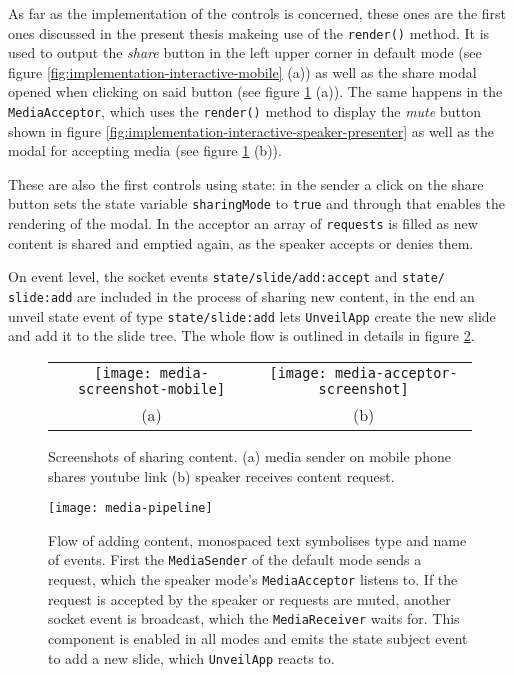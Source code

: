 As far as the implementation of the controls is concerned, these ones are the first ones discussed in the present thesis makeing use of the \texttt{render()} method. It is used to output the \emph{share} button in the left upper corner in default mode (see figure \ref{fig:implementation-interactive-mobile} (a)) as well as the share modal opened when clicking on said button (see figure \ref{fig:implementation-interactive-media} (a)). The same happens in the \texttt{MediaAcceptor}, which uses the \texttt{render()} method to display the \emph{mute} button shown in figure \ref{fig:implementation-interactive-speaker-presenter} as well as the modal for accepting media (see figure \ref{fig:implementation-interactive-media} (b)).

These are also the first controls using state: in the sender a click on the share button sets the state variable \texttt{sharingMode} to \texttt{true} and through that enables the rendering of the modal. In the acceptor an array of \texttt{requests} is filled as new content is shared and emptied again, as the speaker accepts or denies them.

On event level, the socket events \texttt{state/slide/add:accept} and \texttt{state/ slide:add} are included in the process of sharing new content, in the end an unveil state event of type \texttt{state/slide:add} lets \texttt{UnveilApp} create the new slide and add it to the slide tree. The whole flow is outlined in details in figure \ref{fig:implementation-interactive-media-pipeline}.

\begin{figure}
\centering\small
\begin{tabular}{cc}
\texttt{[image: media-screenshot-mobile]}
 &
\texttt{[image: media-acceptor-screenshot]} \\
(a) & (b)
\end{tabular}
\caption{Screenshots of sharing content. (a) media sender on mobile phone shares youtube link (b) speaker receives content request.}
\label{fig:implementation-interactive-media}
\end{figure}

\begin{figure}
\centering
\texttt{[image: media-pipeline]}
\caption{Flow of adding content, monospaced text symbolises type and name of events. First the \texttt{MediaSender} of the default mode sends a request, which the speaker mode's \texttt{MediaAcceptor} listens to. If the request is accepted by the speaker or requests are muted, another socket event is broadcast, which the \texttt{MediaReceiver} waits for. This component is enabled in all modes and emits the state subject event to add a new slide, which \texttt{UnveilApp} reacts to.}
\label{fig:implementation-interactive-media-pipeline}
\end{figure}

